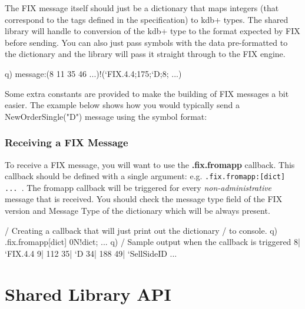 The FIX message itself should just be a dictionary that maps integers (that correspond to the tags defined
in the specification) to kdb+ types. The shared library will handle to conversion of the kdb+ type to the
format expected by FIX before sending. You can also just pass symbols with the data pre-formatted to the dictionary and the library will pass it straight through to the FIX engine.

\begin{qcode}
q) message:(8 11 35 46 ...)!(`FIX.4.4;175;`D;8; ...)
\end{qcode}

Some extra constants are provided to make the building of FIX messages a bit easier. The example below shows how you would typically send a NewOrderSingle("D") message using the symbol format:


\subsection{Receiving a FIX Message}

To receive a FIX message, you will want to use the \textbf{.fix.fromapp} callback. This callback should be defined with a single argument: e.g. \texttt{.fix.fromapp:{[dict] ... }}. The fromapp callback will
be triggered for every \textit{non-administrative} message that is received. You should check the message type field of the FIX version and Message Type of the dictionary which will be always present.

\begin{qcode}
/ Creating a callback that will just print out the dictionary
/ to console.
q) .fix.fromapp{[dict] 0N!dict; }
...
q)
/ Sample output when the callback is triggered
8|  `FIX.4.4
9|  112
35| `D
34| 188
49| `SellSideID
...
\end{qcode}

\chapter{Shared Library API}
